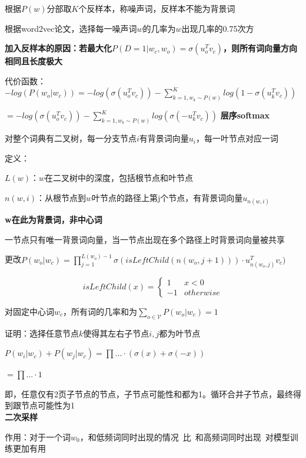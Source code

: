 \documentclass[UTF8]{ctexart}
\begin{document}
  \quad \quad 根据$P(w)$分部取$K$个反样本，称噪声词，反样本不能为背景词

  \quad \quad \quad 根据word2vec论文，选择每一噪声词$w$的几率为$w$出现几率的0.75次方

  \quad \quad \textbf{加入反样本的原因：若最大化$P(D = 1|w_c, w_o) = \sigma(u_o^Tv_c)$，则所有词向量方向相同且长度极大}

  \quad 代价函数：$-log(P(w_o | w_c)) = -log(\sigma(u_o^Tv_c)) - \sum_{k=1, w_k \sim P(w)}^{K}log(1-\sigma(u_k^Tv_c))$

  \quad \quad $ = -log(\sigma(u_o^Tv_c)) - \sum_{k=1, w_k \sim P(w)}^{K}log(\sigma(-u_k^Tv_c))$
  \textbf{层序softmax}
  
  \quad 对整个词典有二叉树，每一分支节点$i$有背景词向量$u_i$，每一叶节点对应一词

  \quad 定义：

  \quad \quad $L(w)$：$w$在二叉树中的深度，包括根节点和叶节点

  \quad \quad $n(w, i)$：从根节点到$w$叶节点的路径上第j个节点，有背景词向量$u_{n(w, i)}$

  \quad \quad \quad \textbf{w在此为背景词，非中心词}

  \quad \quad \quad 一节点只有唯一背景词向量，当一节点出现在多个路径上时背景词向量被共享

  \quad 更改$P(w_o | w_c) = \prod_{j=1}^{L(w_o) - 1} \sigma(isLeftChild(n(w_o, j+1))) \cdot u_{n(w_o, j)}^Tv_c)$

  \quad \quad \begin{equation*}
    isLeftChild(x) = \begin{cases}
    1 &x < 0\\
    -1 & otherwise
    \end{cases}
  \end{equation*}

  \quad \quad 对固定中心词$w_c$，所有词的几率和为$\sum_{o \in \mathcal{V}} P(w_o | w_c) = 1$

  \quad \quad \quad 证明：选择任意节点$k$使得其左右子节点$i, j$都为叶节点

  \quad \quad \quad \quad $P(w_i | w_c) + P(w_j | w_c) = \prod ... \cdot (\sigma(x) + \sigma(-x))$

  \quad \quad \quad \quad $ = \prod ... \cdot 1$

  \quad \quad \quad \quad 即，任意仅有2页子节点的节点，子节点可能性和都为1。循环合并子节点，最终得到跟节点可能性为1\\
\textbf{二次采样}

  作用：对于一个词$w_0$，和低频词同时出现的情况\ 比\ 和高频词同时出现\ 对模型训练更加有用
\end{document}
